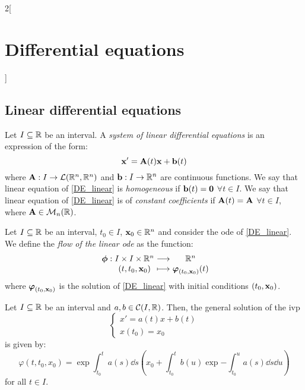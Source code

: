 \documentclass[../../../main.tex]{subfiles}
\begin{document}
\begin{multicols}{2}[\section{Differential equations}]
  \subsection{Linear differential equations}
  \begin{definition}
    Let $I\subseteq\mathbb{R}$ be an interval. A \emph{system of linear differential equations} is an expression of the form:
    \begin{equation}\label{DE_linear}
      \boldsymbol{\mathrm{x}}'=\boldsymbol{\mathrm{A}}(t)\boldsymbol{\mathrm{x}}+\boldsymbol{\mathrm{b}}(t)
    \end{equation}
    where $\boldsymbol{\mathrm{A}}:I\rightarrow\mathcal{L}(\mathbb{R}^n,\mathbb{R}^n)$ and $\boldsymbol{\mathrm{b}}:I\rightarrow\mathbb{R}^n$ are continuous functions.
    We say that linear equation of \cref{DE_linear} is \emph{homogeneous} if $\boldsymbol{\mathrm{b}}(t)=\boldsymbol{\mathrm{0}}$ $\forall t\in I$. We say that linear equation of \cref{DE_linear} is of \emph{constant coefficients} if $\boldsymbol{\mathrm{A}}(t)=\boldsymbol{\mathrm{A}}$ $\forall t\in I$, where $\boldsymbol{\mathrm{A}}\in\mathcal{M}_n(\mathbb{R})$.
  \end{definition}
  \begin{definition}
    Let $I\subseteq\mathbb{R}$ be an interval, $t_0\in I$, $\boldsymbol{\mathrm{x}}_0\in\mathbb{R}^n$ and consider the ode of \cref{DE_linear}. We define the \emph{flow of the linear ode} as the function:
    $$
      \function{\vf{\phi}}{I\times I\times \RR^n}{\RR^n}{(t,t_0,\vf{x}_0)}{\vf{\varphi}_{(t_0,\vf{x}_0)}(t)}
    $$
    where $\boldsymbol{\mathrm{\varphi}}_{(t_0,\boldsymbol{\mathrm{x}}_0)}$ is the solution of \cref{DE_linear} with initial conditions $(t_0,\boldsymbol{\mathrm{x}}_0)$.
  \end{definition}
  \begin{proposition}
    Let $I\subseteq\mathbb{R}$ be an interval and $a,b\in\mathcal{C}(I,\mathbb{R})$. Then, the general solution of the ivp
    $$\begin{cases}
        x'      =a(t)x+b(t) \\
        x(t_0)  =x_0
      \end{cases}$$
    is given by:
    \begin{equation}\label{DE_sol-lin}
      \varphi(t,t_0,x_0)=\exp{\int_{t_0}^ta(s)\dd{s}}\left(x_0+\int_{t_0}^tb(u)\exp{-\int_{t_0}^ua(s)\dd{s}}\dd{u}\right)
    \end{equation}
    for all $t\in I$.
  \end{proposition}

\end{multicols}
\end{document}

